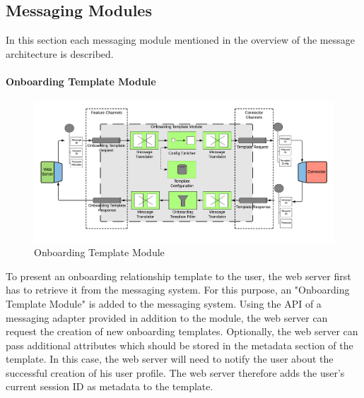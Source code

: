 \subsection{Messaging Modules}

In this section each messaging module mentioned in the overview of the message architecture is described.

\paragraph{Onboarding Template Module}

\begin{figure}[H]
    \centering
    \includegraphics[scale=0.6]{Diagrams/Integration Architecture 1/Technological Integration/6. Onboarding Template Module.pdf}
    \caption{Onboarding Template Module}
    \label{integration1:onboarding_template_module}
\end{figure}

To present an onboarding relationship template to the user, the web server first has to retrieve it from the messaging system. For this purpose, an "Onboarding Template Module" is added to the messaging system. Using the API of a messaging adapter provided in addition to the module, the web server can request the creation of new onboarding templates. Optionally, the web server can pass additional attributes which should be stored in the metadata section of the template. In this case, the web server will need to notify the user about the successful creation of his user profile. The web server therefore adds the user's current session ID as metadata to the template.

